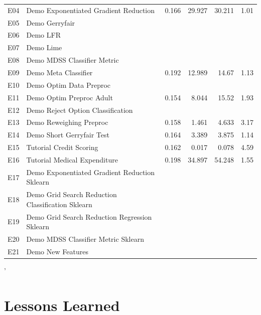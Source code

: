 \documentclass[sigconf,review]{acmart}
\begin{document}
\begin{table}[]
\begin{tabular}{clrrrr}
		E04 & Demo Exponentiated Gradient Reduction             & 0.166 & 29.927 & 30.211 & 1.01 \\
		E05 & Demo Gerryfair                                    &       &        &        &      \\
		E06 & Demo LFR                                          &       &        &        &      \\
		E07 & Demo   Lime                                       &       &        &        &      \\
		E08 & Demo MDSS Classifier Metric                       &       &        &        &      \\
		E09 & Demo Meta Classifier                              & 0.192 & 12.989 & 14.67  & 1.13 \\
		E10 & Demo Optim Data Preproc                           &       &        &        &      \\
		E11 & Demo Optim Preproc Adult                          & 0.154 & 8.044  & 15.52  & 1.93 \\
		E12 & Demo Reject Option Classification                 &       &        &        &      \\
		E13 & Demo Reweighing Preproc                           & 0.158 & 1.461  & 4.633  & 3.17 \\
		E14 & Demo Short Gerryfair Test                         & 0.164 & 3.389  & 3.875  & 1.14 \\
		E15 & Tutorial Credit Scoring                           & 0.162 & 0.017  & 0.078  & 4.59 \\
		E16 & Tutorial Medical Expenditure                      & 0.198 & 34.897 & 54.248 & 1.55 \\
		E17 & Demo Exponentiated Gradient Reduction Sklearn     &       &        &        &      \\
		E18 & Demo Grid Search Reduction Classification Sklearn &       &        &        &      \\
		E19 & Demo Grid Search Reduction Regression Sklearn     &       &        &        &      \\
		E20 & Demo MDSS Classifier Metric Sklearn               &       &        &        &      \\
		E21 & Demo New Features                                 &       &        &        &      \\ \hline
	\end{tabular}
\end{table}
'
\section{Lessons Learned}
\label{sec:lessons_learned}
\end{document}

